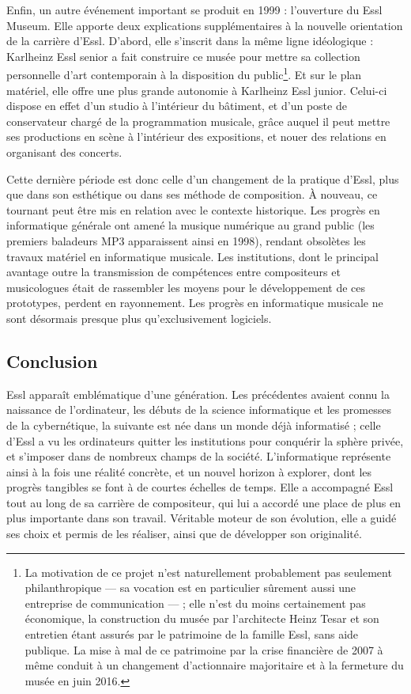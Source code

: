 \documentclass[a4paper,12pt]{article}
\begin{document}
Enfin, un autre événement important se produit en 1999 : l'ouverture du Essl Museum. Elle apporte deux explications supplémentaires à la nouvelle orientation de la carrière d'Essl. D'abord, elle s'inscrit dans la même ligne idéologique : Karlheinz Essl senior a fait construire ce musée pour mettre sa collection personnelle d'art contemporain à la disposition du public\footnote{La motivation de ce projet n'est naturellement probablement pas seulement philanthropique --- sa vocation est en particulier sûrement aussi une entreprise de communication --- ; elle n'est du moins certainement pas économique, la construction du musée par l'architecte Heinz Tesar et son entretien étant assurés par le patrimoine de la famille Essl, sans aide publique. La mise à mal de ce patrimoine par la crise financière de 2007 à même conduit à un changement d'actionnaire majoritaire et à la fermeture du musée en juin 2016.}. Et sur le plan matériel, elle offre une plus grande autonomie à Karlheinz Essl junior. Celui-ci dispose en effet d'un studio à l'intérieur du bâtiment, et d'un poste de conservateur chargé de la programmation musicale, grâce auquel il peut mettre ses productions en scène à l'intérieur des expositions, et nouer des relations en organisant des concerts.

Cette dernière période est donc celle d'un changement de la pratique d'Essl, plus que dans son esthétique ou dans ses méthode de composition. À nouveau, ce tournant peut être mis en relation avec le contexte historique. Les progrès en informatique générale ont amené la musique numérique au grand public (les premiers baladeurs MP3 apparaissent ainsi en 1998), rendant obsolètes les travaux matériel en informatique musicale. Les institutions, dont le principal avantage outre la transmission de compétences entre compositeurs et musicologues était de rassembler les moyens pour le développement de ces prototypes, perdent en rayonnement. Les progrès en informatique musicale ne sont désormais presque plus qu'exclusivement logiciels.

\subsection{Conclusion}

Essl apparaît emblématique d'une génération. Les précédentes avaient connu la naissance de l'ordinateur, les débuts de la science informatique et les promesses de la cybernétique, la suivante est née dans un monde déjà informatisé ; celle d'Essl a vu les ordinateurs quitter les institutions pour conquérir la sphère privée, et s'imposer dans de nombreux champs de la société. L'informatique représente ainsi à la fois une réalité concrète, et un nouvel horizon à explorer, dont les progrès tangibles se font à de courtes échelles de temps. Elle a accompagné Essl tout au long de sa carrière de compositeur, qui lui a accordé une place de plus en plus importante dans son travail. Véritable moteur de son évolution, elle a guidé ses choix et permis de les réaliser, ainsi que de développer son originalité.
\end{document}
